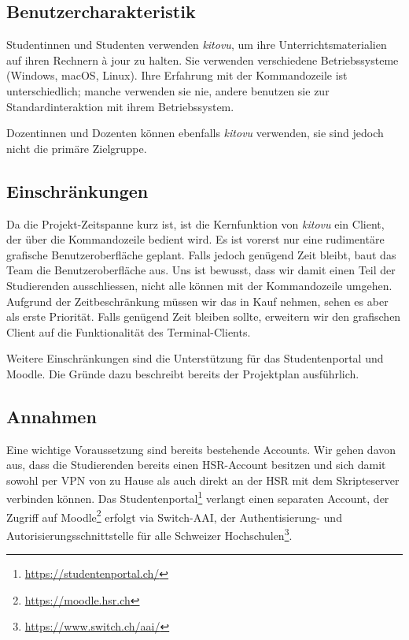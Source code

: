 \documentclass[a4paper]{article}
\begin{document}
\subsection{Benutzercharakteristik}
Studentinnen und Studenten verwenden \emph{kitovu}, um ihre Unterrichtsmaterialien auf ihren Rechnern à jour zu halten. Sie verwenden verschiedene Betriebssysteme (Windows, macOS, Linux). Ihre Erfahrung mit der Kommandozeile ist unterschiedlich; manche verwenden sie nie, andere benutzen sie zur Standardinteraktion mit ihrem Betriebssystem.

Dozentinnen und Dozenten können ebenfalls \emph{kitovu} verwenden, sie sind jedoch nicht die primäre Zielgruppe.

\subsection{Einschränkungen}
Da die Projekt-Zeitspanne kurz ist, ist die Kernfunktion von \emph{kitovu} ein Client, der über die Kommandozeile bedient wird. Es ist vorerst nur eine rudimentäre grafische Benutzeroberfläche geplant. Falls jedoch genügend Zeit bleibt, baut das Team die Benutzeroberfläche aus. Uns ist bewusst, dass wir damit einen Teil der Studierenden ausschliessen, nicht alle können mit der Kommandozeile umgehen. Aufgrund der Zeitbeschränkung müssen wir das in Kauf nehmen, sehen es aber als erste Priorität. Falls genügend Zeit bleiben sollte, erweitern wir den grafischen Client auf die Funktionalität des Terminal-Clients.

Weitere Einschränkungen sind die Unterstützung für das Studentenportal und Moodle. Die Gründe dazu beschreibt bereits der Projektplan ausführlich.


\subsection{Annahmen}
Eine wichtige Voraussetzung sind bereits bestehende Accounts. Wir gehen davon aus, dass die Studierenden bereits einen HSR-Account besitzen und sich damit sowohl per VPN von zu Hause als auch direkt an der HSR mit dem Skripteserver verbinden können. Das Studentenportal\footnote{\url{https://studentenportal.ch/}} verlangt einen separaten Account, der Zugriff auf Moodle\footnote{\url{https://moodle.hsr.ch}} erfolgt via Switch-AAI, der Authentisierung- und Autorisierungsschnittstelle für alle Schweizer Hochschulen\footnote{\url{https://www.switch.ch/aai/}}.
\end{document}
